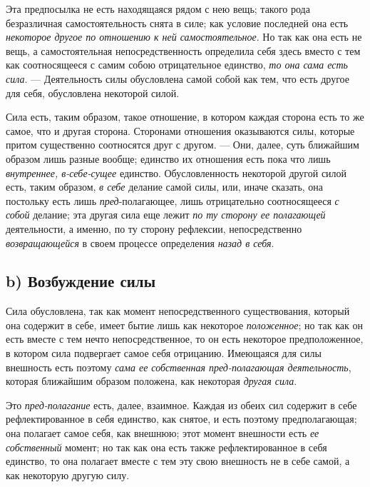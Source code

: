 Эта предпосылка не есть находящаяся рядом с нею вещь; такого рода
безразличная самостоятельность снята в силе; как условие последней она есть
{\em некоторое другое по отношению к ней
самостоятельное}. Но так как она есть не вещь, а самостоятельная
непосредственность определила себя здесь вместо с тем как соотносящееся с
самим собою отрицательное единство, {\em то она сама
есть сила}. — Деятельность силы обусловлена самой собой как тем, что есть
другое для себя, обусловлена некоторой силой.

Сила есть, таким образом, такое отношение, в котором каждая сторона есть то
же самое, что и другая сторона. Сторонами отношения оказываются силы,
которые притом существенно соотносятся друг с другом. — Они, далее, суть
ближайшим образом лишь разные вообще; единство их отношения есть пока что
лишь {\em внутреннее, в-себе-сущее} единство.
Обусловленность некоторой другой силой есть, таким образом,
{\em в себе} делание самой силы, или, иначе сказать,
она постольку есть лишь {\em пред}{}-полагающее, лишь
отрицательно соотносящееся {\em с собой} делание; эта
другая сила еще лежит {\em по ту сторону ее полагающей}
деятельности, а именно, по ту сторону рефлексии, непосредственно
{\em возвращающейся} в своем процессе определения
{\em назад в себя}.


\subsection[b) Возбуждение силы]{b) Возбуждение силы}

Сила обусловлена, так как момент
непосредственного существования, который она содержит в себе, имеет бытие
лишь как некоторое {\em положенное}; но так как он есть
вместе с тем нечто непосредственное, то он есть некоторое предположенное, в
котором сила подвергает самое себя отрицанию. Имеющаяся для силы внешность
есть поэтому {\em сама ее собственная пред-полагающая
деятельность}, которая ближайшим образом положена, как некоторая
{\em другая сила}.

Это {\em пред-полагание} есть, далее, взаимное. Каждая
из обеих сил содержит в себе рефлектированное в себя единство, как снятое,
и есть поэтому предполагающая; она полагает самое себя, как внешнюю; этот
момент внешности есть {\em ее собственный} момент; но
так как она есть также рефлектированное в себя единство, то она полагает
вместе с тем эту свою внешность не в себе самой, а как некоторую другую
силу.

